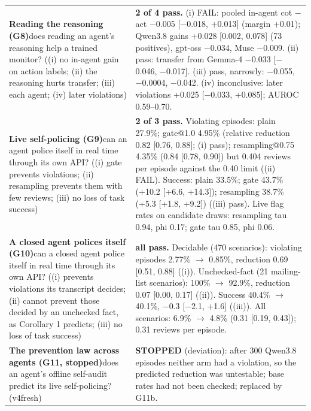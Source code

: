 {\begin{longtable}{p{}p{}}
\textbf{Reading the reasoning (G8)}\newline does reading an agent's reasoning help a trained monitor? ((i) no in-agent gain on action labels; (ii) the reasoning hurts transfer; (iii) each agent; (iv) later violations) & \textbf{2 of 4 pass.} (i) FAIL: pooled in-agent cot $-$ act $-$0.005 [$-$0.018, +0.013] (margin +0.01); Qwen3.8 gains +0.028 [0.002, 0.078] (73 positives), gpt-oss $-$0.034, Muse $-$0.009. (ii) pass: transfer from Gemma-4 $-$0.033 [$-$0.046, $-$0.017]. (iii) pass, narrowly: $-$0.055, $-$0.0004, $-$0.042. (iv) inconclusive: later violations +0.025 [$-$0.033, +0.085]; AUROC 0.59--0.70.\\[2pt]
\textbf{Live self-policing (G9)}\newline can an agent police itself in real time through its own API? ((i) gate prevents violations; (ii) resampling prevents them with few reviews; (iii) no loss of task success) & \textbf{2 of 3 pass.} Violating episodes: plain 27.9\%; gate@1.0 4.95\% (relative reduction 0.82 [0.76, 0.88]; (i) pass); resampling@0.75 4.35\% (0.84 [0.78, 0.90]) but 0.404 reviews per episode against the 0.40 limit ((ii) FAIL). Success: plain 33.5\%; gate 43.7\% (+10.2 [+6.6, +14.3]); resampling 38.7\% (+5.3 [+1.8, +9.2]) ((iii) pass). Live flag rates on candidate draws: resampling tau 0.94, phi 0.17; gate tau 0.85, phi 0.06.\\[2pt]
\textbf{A closed agent polices itself (G10)}\newline can a closed agent police itself in real time through its own API? ((i) prevents violations its transcript decides; (ii) cannot prevent those decided by an unchecked fact, as Corollary 1 predicts; (iii) no loss of task success) & \textbf{all pass.} Decidable (470 scenarios): violating episodes 2.77\% $\rightarrow$ 0.85\%, reduction 0.69 [0.51, 0.88] ((i)). Unchecked-fact (21 mailing-list scenarios): 100\% $\rightarrow$ 92.9\%, reduction 0.07 [0.00, 0.17] ((ii)). Success 40.4\% $\rightarrow$ 40.1\%, $-$0.3 [$-$2.1, +1.6] ((iii)). All scenarios: 6.9\% $\rightarrow$ 4.8\% (0.31 [0.19, 0.43]); 0.31 reviews per episode.\\[2pt]
\textbf{The prevention law across agents (G11, stopped)}\newline does an agent's offline self-audit predict its live self-policing? (v4fresh) & \textbf{STOPPED} (deviation): after 300 Qwen3.8 episodes neither arm had a violation, so the predicted reduction was untestable; base rates had not been checked; replaced by G11b.\\[2pt]

\end{longtable}}

